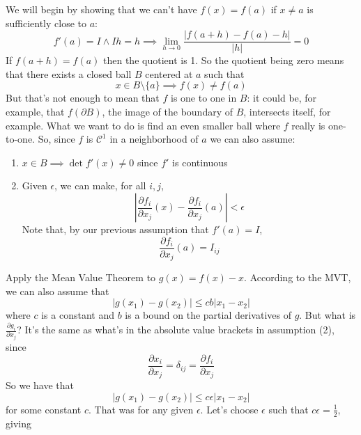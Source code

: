 \documentclass{article}
\newcommand{\mc}[1]{\mathcal{#1}}
\newcommand{\prt}[2]{\frac{\partial #1}{\partial #2}}
\begin{document}
We will begin by showing that we can't have \(f(x) = f(a)\) if \(x \neq a\) is sufficiently close to \(a\):
\begin{equation}f'(a) = I \land Ih = h \implies \lim_{h \to 0}\frac{|f(a + h) - f(a) - h|}{|h|} = 0\end{equation}
If \(f(a + h) = f(a)\) then the quotient is 1. So the quotient being zero means that there exists a closed ball \(B\) centered at \(a\) such that
\begin{equation}x \in B \setminus \{a\} \implies f(x) \neq f(a)\end{equation}
But that's not enough to mean that \(f\) is one to one in \(B\): it could be, for example, that \(f(\partial B)\), the image of the boundary of \(B\), intersects itself, for example. What we want to do is find an even smaller ball where \(f\) really is one-to-one. So, since \(f\) is \(\mc{C}^1\) in a neighborhood of \(a\) we can also assume:
\begin{enumerate}

  \item \(x \in B \implies \det f'(x) \neq 0\) since \(f'\) is continuous

  \item Given \(\epsilon\), we can make, for all \(i, j\), \begin{equation}
    \left|\prt{f_i}{x_j}(x) - \prt{f_i}{x_j}(a)\right| < \epsilon
  \end{equation}
  Note that, by our previous assumption that \(f'(a) = I\),
  \begin{equation}\prt{f_i}{x_j}(a) = I_{ij}\end{equation}

\end{enumerate}
Apply the Mean Value Theorem to \(g(x) = f(x) - x\). According to the MVT, we can also assume that
\begin{equation}|g(x_1) - g(x_2)| \leq cb|x_1 - x_2|\end{equation}
where \(c\) is a constant and \(b\) is a bound on the partial derivatives of \(g\). But what is \(\prt{g_i}{x_j}\)? It's the same as what's in the absolute value brackets in assumption (2), since
\begin{equation}\prt{x_i}{x_j} = \delta_{ij} = \prt{f_i}{x_j}\end{equation}
So we have that
\begin{equation}|g(x_1) - g(x_2)| \leq c\epsilon|x_1 - x_2|\end{equation}
for some constant \(c\). That was for any given \(\epsilon\). Let's choose \(\epsilon\) such that \(c\epsilon = \frac{1}{2}\), giving
\end{document}
